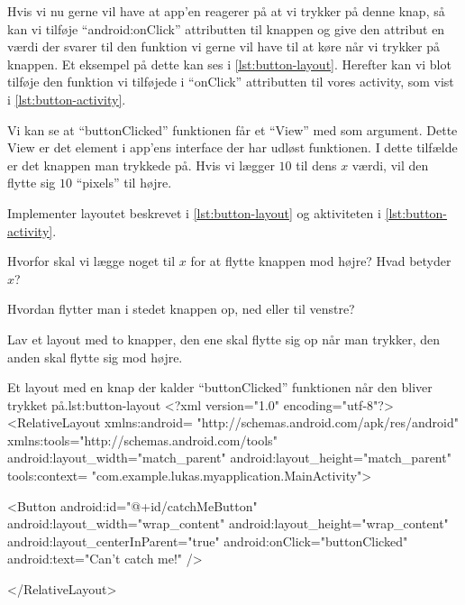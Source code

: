 Hvis vi nu gerne vil have at app'en reagerer på at vi trykker på denne knap, så 
kan vi tilføje ``android:onClick'' attributten til knappen og give den attribut 
en værdi der svarer til den funktion vi gerne vil have til at køre når vi 
trykker på knappen. Et eksempel på dette kan ses i \autoref{lst:button-layout}.
Herefter kan vi blot tilføje den funktion vi tilføjede i ``onClick'' 
attributten til vores activity, som vist i \autoref{lst:button-activity}.

Vi kan se at ``buttonClicked'' funktionen får et ``View'' med som argument. 
Dette View er det element i app'ens \gls{interface} der har udløst funktionen. 
I dette tilfælde er det knappen man trykkede på. Hvis vi lægger $10$ til dens 
$x$ værdi, vil den flytte sig $10$ ``pixels'' til højre.

\begin{exercise}
	Implementer layoutet beskrevet i \autoref{lst:button-layout} og aktiviteten 
	i \autoref{lst:button-activity}.
\end{exercise}

\begin{exercise}
	Hvorfor skal vi lægge noget til $x$ for at flytte knappen mod højre? Hvad 
	betyder $x$?
\end{exercise}

\begin{exercise}
	Hvordan flytter man i stedet knappen op, ned eller til venstre?
\end{exercise}

\begin{exercise}
	Lav et layout med to knapper, den ene skal flytte sig op når man trykker, 
	den anden skal flytte sig mod højre.
\end{exercise}

\clearpage


\begin{XmlCode}{Et layout med en knap der kalder ``buttonClicked'' funktionen %
når den bliver trykket på.}{lst:button-layout}
	<?xml version="1.0" encoding="utf-8"?>
	<RelativeLayout 
		xmlns:android=
			"http://schemas.android.com/apk/res/android"
		xmlns:tools="http://schemas.android.com/tools"
		android:layout_width="match_parent"
		android:layout_height="match_parent"
		tools:context=
			"com.example.lukas.myapplication.MainActivity">
	
	<Button
		android:id="@+id/catchMeButton"
		android:layout_width="wrap_content"
		android:layout_height="wrap_content"
		android:layout_centerInParent="true"
		android:onClick="buttonClicked"
		android:text="Can't catch me!" />
		
	</RelativeLayout>
\end{XmlCode}

